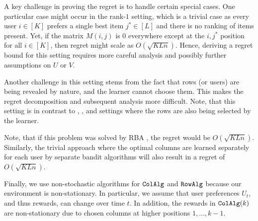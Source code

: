 A key challenge in proving the regret is to handle certain special cases. One particular case might occur in the rank-$1$ setting, which is a trivial case as every user $i \in [K]$ prefers a single best item $j^\ast \in [L]$ and there is no ranking of items present. Yet, if the matrix $M(i,j)$ is $0$ everywhere except at the $i,j^\ast$ position for all $i\in [K]$, then regret might scale as $O(\sqrt{KLn})$. Hence, deriving a regret bound for this setting requires more careful analysis and possibly further assumptions on $U$ or $V$.

Another challenge in this setting stems from the fact that rows (or users) are being revealed by nature, and the learner cannot choose them. This makes the regret decomposition and subsequent analysis more difficult. Note, that this setting is in contrast to \citet{katariya2017bernoulli}, \citet{katariya2016stochastic}, and  \citet{kveton2017stochastic} settings where the rows are also being selected by the learner.


Note, that if this problem was solved by RBA \citep{radlinski2008learning}, the regret would be $O(\sqrt{K L n})$. Similarly, the trivial approach where the optimal columns are learned separately for each user by separate bandit algorithms will also result in a regret of $O(\sqrt{K L n})$.

Finally, we use non-stochastic algorithms for ${\tt ColAlg}$ and ${\tt RowAlg}$ because our environment is non-stationary. In particular, we assume that user preferences $U_t$, and thus rewards, can change over time $t$. In addition, the rewards in ${\tt ColAlg}(k)$ are non-stationary due to chosen columns at higher positions $1, \dots, k - 1$.
